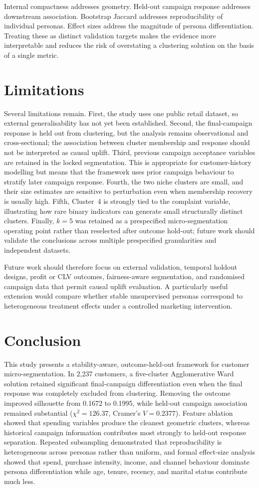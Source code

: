 \documentclass[10pt]{article}
\begin{document}
Internal compactness addresses geometry. Held-out campaign response addresses downstream association. Bootstrap Jaccard addresses reproducibility of individual personas. Effect sizes address the magnitude of persona differentiation. Treating these as distinct validation targets makes the evidence more interpretable and reduces the risk of overstating a clustering solution on the basis of a single metric.

\section{Limitations}
Several limitations remain. First, the study uses one public retail dataset, so external generalisability has not yet been established. Second, the final-campaign response is held out from clustering, but the analysis remains observational and cross-sectional; the association between cluster membership and response should not be interpreted as causal uplift. Third, previous campaign acceptance variables are retained in the locked segmentation. This is appropriate for customer-history modelling but means that the framework uses prior campaign behaviour to stratify later campaign response. Fourth, the two niche clusters are small, and their size estimates are sensitive to perturbation even when membership recovery is usually high. Fifth, Cluster~4 is strongly tied to the complaint variable, illustrating how rare binary indicators can generate small structurally distinct clusters. Finally, $k=5$ was retained as a prespecified micro-segmentation operating point rather than reselected after outcome hold-out; future work should validate the conclusions across multiple prespecified granularities and independent datasets.

Future work should therefore focus on external validation, temporal holdout designs, profit or CLV outcomes, fairness-aware segmentation, and randomised campaign data that permit causal uplift evaluation. A particularly useful extension would compare whether stable unsupervised personas correspond to heterogeneous treatment effects under a controlled marketing intervention.

\section{Conclusion}
This study presents a stability-aware, outcome-held-out framework for customer micro-segmentation. In 2,237 customers, a five-cluster Agglomerative Ward solution retained significant final-campaign differentiation even when the final response was completely excluded from clustering. Removing the outcome improved silhouette from 0.1672 to 0.1995, while held-out campaign association remained substantial ($\chi^2=126.37$, Cramer's $V=0.2377$). Feature ablation showed that spending variables produce the cleanest geometric clusters, whereas historical campaign information contributes most strongly to held-out response separation. Repeated subsampling demonstrated that reproducibility is heterogeneous across personas rather than uniform, and formal effect-size analysis showed that spend, purchase intensity, income, and channel behaviour dominate persona differentiation while age, tenure, recency, and marital status contribute much less.
\end{document}
